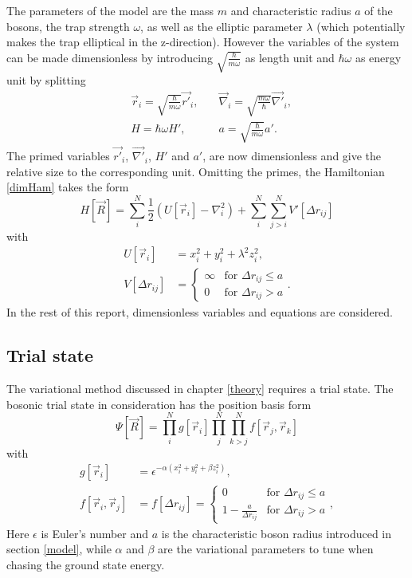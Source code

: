 \documentclass[a4paper,8pt]{article}
\begin{document}
\begin{multicols}{2}
The parameters of the model are the mass $m$ and characteristic radius $a$ of the bosons, the trap strength $\omega$, as well as the elliptic parameter $\lambda$ (which potentially makes the trap elliptical in the z-direction). However the variables of the system can be made dimensionless by introducing $\sqrt{\frac{\hbar}{m\omega}}$ as length unit and $\hbar\omega$ as energy unit by splitting
\begin{align}
&\vec{r}_i = \sqrt{\frac{\hbar}{m\omega}}\vec{r'}_i, \quad &\vec{\nabla}_i = \sqrt{\frac{m\omega}{\hbar}}\vec{\nabla'}_i, \nonumber\\
&H = \hbar\omega H', \quad\quad &a = \sqrt{\frac{\hbar}{m\omega}}a'. \nonumber
\end{align}
The primed variables $\vec{r'}_i$, $\vec{\nabla'}_i$, $H'$ and $a'$, are now dimensionless and give the relative size to the corresponding unit. Omitting the primes, the Hamiltonian \eqref{dimHam} takes the form
\begin{equation}\label{Ham}
H[\vec{R}] = \sum\limits_i^N \frac{1}{2}\left( U[\vec{r}_i] - {\nabla}_i^2\right) + \sum\limits_i^N\sum\limits_{j > i}^N V'[\Delta{r}_{ij}]
\end{equation}
with
\begin{align}
U[\vec{r}_i] &= x_i^2+y_i^2+\lambda^2z_i^2, \label{U}\\
V[\Delta{r}_{ij}] &=\begin{cases} \infty & \text{for $\Delta{r}_{ij} \leq a$} \\
0 & \text{for $\Delta{r}_{ij} > a$} \end{cases}. \label{V}
\end{align}
In the rest of this report, dimensionless variables and equations are considered.


\subsection{Trial state}
The variational method discussed in chapter \ref{theory} requires a trial state. The bosonic trial state in consideration has the position basis form
\begin{equation}\label{trialstate}
\Psi[\vec{R}] = \prod\limits_i^N g[\vec{r}_i] \prod\limits_j^N\prod\limits_{k > j}^N f[\vec{r}_j,\vec{r}_k]
\end{equation}
with
\begin{align}
g[\vec{r}_i] &= \epsilon^{-\alpha\left(x_i^2+y_i^2+ \beta z_i^2\right)}, \label{g}\\
f[\vec{r}_i,\vec{r}_j] &= f[\Delta{r}_{ij}] = \begin{cases} 0 & \text{for $\Delta{r}_{ij} \leq a$} \\
1-\frac{a}{\Delta{r}_{ij}} & \text{for $\Delta{r}_{ij} > a$} \end{cases}, \label{f}
\end{align}
Here $\epsilon$ is Euler's number and $a$ is the characteristic boson radius introduced in section \ref{model}, while $\alpha$ and $\beta$ are the variational parameters to tune when chasing the ground state energy.



\end{multicols}
\end{document}
